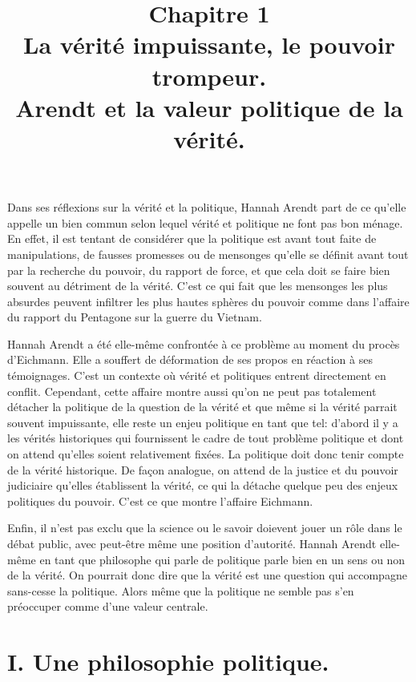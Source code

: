 \documentclass[12pt]{article}
\title{Chapitre 1\\\large La vérité impuissante, le pouvoir trompeur.\\Arendt et la valeur politique de la vérité.}
\date{}
\author{}
\begin{document}
\maketitle
\thispagestyle{fancy}
Dans ses réflexions sur la vérité et la politique, Hannah Arendt part de ce qu'elle appelle un bien commun selon lequel vérité et politique ne font pas bon ménage.
En effet, il est tentant de considérer que la politique est avant tout faite de manipulations, de fausses promesses ou de mensonges qu'elle se définit avant tout par la recherche du pouvoir, du rapport de force, et que cela doit se faire bien souvent au détriment de la vérité.
C'est ce qui fait que les mensonges les plus absurdes peuvent infiltrer les plus hautes sphères du pouvoir comme dans l'affaire du rapport du Pentagone sur la guerre du Vietnam.\par
Hannah Arendt a été elle-même confrontée à ce problème au moment du procès d'Eichmann. Elle a souffert de déformation de ses propos en réaction à ses témoignages.
C'est un contexte où vérité et politiques entrent directement en conflit.
Cependant, cette affaire montre aussi qu'on ne peut pas totalement détacher la politique de la question de la vérité et que même si la vérité parrait souvent impuissante, elle reste un enjeu politique en tant que tel: d'abord il y a les vérités historiques qui fournissent le cadre de tout problème politique et dont on attend qu'elles soient relativement fixées.
La politique doit donc tenir compte de la vérité historique.
De façon analogue, on attend de la justice et du pouvoir judiciaire qu'elles établissent la vérité, ce qui la détache quelque peu des enjeux politiques du pouvoir.
C'est ce que montre l'affaire Eichmann.\par
Enfin, il n'est pas exclu que la science ou le savoir doievent jouer un rôle dans le débat public, avec peut-être même une position d'autorité.
Hannah Arendt elle-même en tant que philosophe qui parle de politique parle bien en un sens ou non de la vérité.
On pourrait donc dire que la vérité est une question qui accompagne sans-cesse la politique.
Alors même que la politique ne semble pas s'en préoccuper comme d'une valeur centrale.
\pagebreak
\section*{\color{red}I. Une philosophie politique.}
\end{document}
